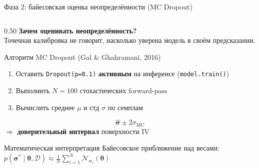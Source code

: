 \documentclass[aspectratio=169, 10pt]{beamer}
\begin{document}
\begin{frame}{Фаза 2: байесовская оценка неопределённости (MC Dropout)}
  \begin{columns}[T]

    \begin{column}{0.50\textwidth}
      \textbf{Зачем оценивать неопределённость?}\\[0.3em]
      {\small Точечная калибровка не говорит, насколько
      уверена модель в своём предсказании.}\\[0.5em]

      \begin{block}{Алгоритм MC Dropout \small(Gal \& Ghahramani, 2016)}
        \small
        \begin{enumerate}
          \item Оставить \texttt{Dropout(p=0.1)} \textbf{активным} на инференсе
                (\texttt{model.train()})
          \item Выполнить $N = 100$ стохастических forward-pass
          \item Вычислить среднее $\mu$ и стд $\sigma$ по семплам
        \end{enumerate}
        \[\hat{\boldsymbol\sigma} \pm 2\sigma_{\mathrm{MC}}\]
        $\Rightarrow$ \textbf{доверительный интервал} поверхности IV
      \end{block}

      \vspace{0.2em}
      \begin{block}{Математическая интерпретация}
        \small
        Байесовское приближение над весами:
        $p(\boldsymbol\sigma^*\mid\boldsymbol\theta,\mathcal{D})
          \approx \frac{1}{N}\sum_{i=1}^{N}\mathcal{N}_{w_i}(\boldsymbol\theta)$
      \end{block}
    \end{column}


\end{columns}
\end{frame}
\end{document}
